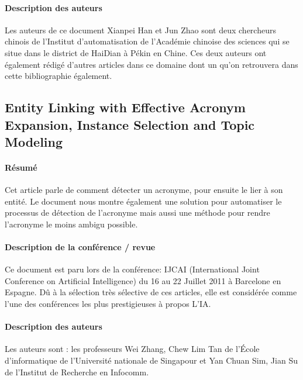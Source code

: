 \documentclass{article}
\begin{document}
\paragraph{Description des auteurs}
Les auteurs de ce document Xianpei Han et Jun Zhao sont deux chercheurs chinois de l'Institut d'automatisation de l'Académie chinoise des sciences qui se situe dans le district de HaiDian à Pékin en Chine. Ces deux auteurs ont également rédigé d'autres articles dans ce domaine dont un qu'on retrouvera dans cette bibliographie également.

\subsection{Entity Linking with Effective Acronym Expansion, Instance Selection and Topic Modeling\cite{article-9}}

\paragraph{Résumé}

Cet article parle de comment détecter un acronyme, pour ensuite le lier à son entité. Le document nous montre également une solution pour automatiser le processus de détection de l’acronyme mais aussi une méthode pour rendre l’acronyme le moins ambigu possible.

\paragraph{Description de la conférence / revue}

Ce document est paru lors de la conférence: IJCAI (International Joint Conference on Artificial Intelligence) du 16 au 22 Juillet 2011 à Barcelone en Espagne. Dû à la sélection très sélective de ces articles, elle est considérée comme l'une des conférences les plus prestigieuses à propos L'IA.

\paragraph{Description des auteurs}

Les auteurs sont : les professeurs Wei Zhang, Chew Lim Tan de l'École d'informatique de l'Université nationale de Singapour et Yan Chuan Sim, Jian Su de l'Institut de Recherche en Infocomm.
\end{document}
